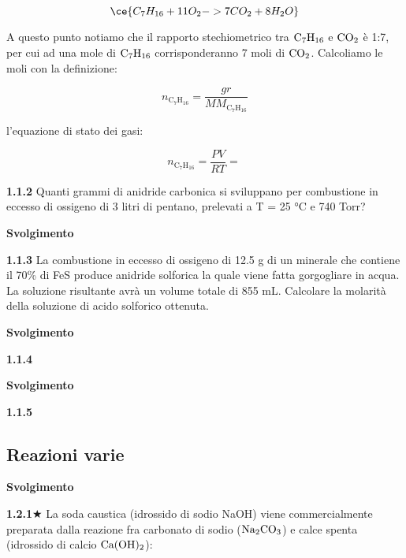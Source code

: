$$\ce{C_7H_{16} + 11O_2 -> 7CO_2 + 8H_2O}$$

A questo punto notiamo che il rapporto stechiometrico tra $\rm C_7H_{16}$ e $\rm CO_2$ è 1:7, per cui ad una mole di $\rm C_7H_{16}$ corrisponderanno 7 moli di $\rm CO_2$. Calcoliamo le moli con la definizione:

$$n_{\text{C}_7\text{H}_{16}}=\frac{gr}{MM_{\text{C}_7\text{H}_{16}}}$$

l'equazione di stato dei gasi:

$$n_{\text{C}_7\text{H}_{16}}=\frac{PV}{RT}=\frac{}{}$$

\vspace{0.2cm}\textbf{1.1.2} Quanti grammi di anidride carbonica si sviluppano per combustione in eccesso di ossigeno di 3
litri di pentano, prelevati a T = 25 °C e 740 Torr?

\vspace{0.2cm}\large\textbf{Svolgimento}\normalsize

\vspace{0.2cm}

\vspace{0.2cm}\textbf{1.1.3} La combustione in eccesso di ossigeno di 12.5 g di un minerale che contiene il 70\% di FeS
produce anidride solforica la quale viene fatta gorgogliare in acqua. La soluzione risultante avrà un
volume totale di 855 mL. Calcolare la molarità della soluzione di acido solforico ottenuta.

\vspace{0.2cm}\large\textbf{Svolgimento}\normalsize

\vspace{0.2cm}

\vspace{0.2cm}\textbf{1.1.4} 

\large\textbf{Svolgimento}\normalsize

\vspace{0.2cm}

\vspace{0.2cm}\textbf{1.1.5} 
\subsection{Reazioni varie}

\large\textbf{Svolgimento}\normalsize

\vspace{0.2cm}

\textbf{1.2.1}$\bigstar$ La soda caustica (idrossido di sodio NaOH) viene commercialmente preparata dalla reazione fra carbonato di sodio ($\rm Na_2CO_3$) e calce spenta (idrossido di calcio $\rm Ca(OH)_2$):

